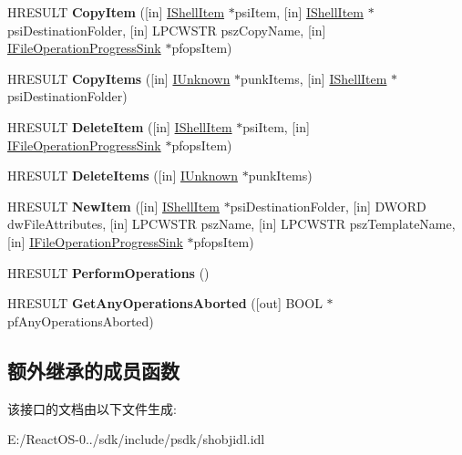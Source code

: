 \begin{DoxyCompactItemize}
\mbox{\label{interface_i_file_operation_ab05a00915870328eaac046475ecc8ac5}} 
H\+R\+E\+S\+U\+LT {\bfseries Copy\+Item} (\mbox{[}in\mbox{]} \hyperlink{interface_i_shell_item}{I\+Shell\+Item} $\ast$psi\+Item, \mbox{[}in\mbox{]} \hyperlink{interface_i_shell_item}{I\+Shell\+Item} $\ast$psi\+Destination\+Folder, \mbox{[}in\mbox{]} L\+P\+C\+W\+S\+TR psz\+Copy\+Name, \mbox{[}in\mbox{]} \hyperlink{interface_i_file_operation_progress_sink}{I\+File\+Operation\+Progress\+Sink} $\ast$pfops\+Item)
\item 
\mbox{\label{interface_i_file_operation_ada48ad5352d05a3d16321924d1196a7f}} 
H\+R\+E\+S\+U\+LT {\bfseries Copy\+Items} (\mbox{[}in\mbox{]} \hyperlink{interface_i_unknown}{I\+Unknown} $\ast$punk\+Items, \mbox{[}in\mbox{]} \hyperlink{interface_i_shell_item}{I\+Shell\+Item} $\ast$psi\+Destination\+Folder)
\item 
\mbox{\label{interface_i_file_operation_a26e6d431e2fe2bf5e1cd64b589f7b92d}} 
H\+R\+E\+S\+U\+LT {\bfseries Delete\+Item} (\mbox{[}in\mbox{]} \hyperlink{interface_i_shell_item}{I\+Shell\+Item} $\ast$psi\+Item, \mbox{[}in\mbox{]} \hyperlink{interface_i_file_operation_progress_sink}{I\+File\+Operation\+Progress\+Sink} $\ast$pfops\+Item)
\item 
\mbox{\label{interface_i_file_operation_a0f0c6de04c9fa75f0e3b5e19b87f828f}} 
H\+R\+E\+S\+U\+LT {\bfseries Delete\+Items} (\mbox{[}in\mbox{]} \hyperlink{interface_i_unknown}{I\+Unknown} $\ast$punk\+Items)
\item 
\mbox{\label{interface_i_file_operation_aa1a2e9eb26abf8167b1cb4df65bbbdbb}} 
H\+R\+E\+S\+U\+LT {\bfseries New\+Item} (\mbox{[}in\mbox{]} \hyperlink{interface_i_shell_item}{I\+Shell\+Item} $\ast$psi\+Destination\+Folder, \mbox{[}in\mbox{]} D\+W\+O\+RD dw\+File\+Attributes, \mbox{[}in\mbox{]} L\+P\+C\+W\+S\+TR psz\+Name, \mbox{[}in\mbox{]} L\+P\+C\+W\+S\+TR psz\+Template\+Name, \mbox{[}in\mbox{]} \hyperlink{interface_i_file_operation_progress_sink}{I\+File\+Operation\+Progress\+Sink} $\ast$pfops\+Item)
\item 
\mbox{\label{interface_i_file_operation_ac542d99778fe990a67f34e6abf3f28df}} 
H\+R\+E\+S\+U\+LT {\bfseries Perform\+Operations} ()
\item 
\mbox{\label{interface_i_file_operation_a084d82762226cbdd588e4dae19343f2a}} 
H\+R\+E\+S\+U\+LT {\bfseries Get\+Any\+Operations\+Aborted} (\mbox{[}out\mbox{]} B\+O\+OL $\ast$pf\+Any\+Operations\+Aborted)
\end{DoxyCompactItemize}
\subsection*{额外继承的成员函数}


该接口的文档由以下文件生成\+:\begin{DoxyCompactItemize}
\item 
E\+:/\+React\+O\+S-\/0../sdk/include/psdk/shobjidl.\+idl\end{DoxyCompactItemize}
